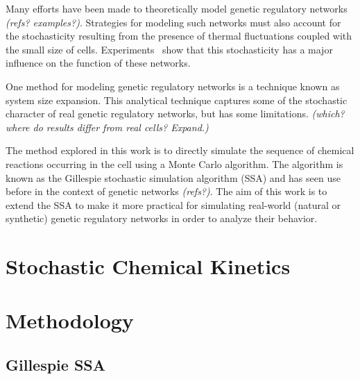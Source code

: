 \documentclass[english,letterpaper,12pt]{article}
\begin{document}
\begin{doublespacing}
Many efforts have been made to theoretically model genetic regulatory networks \textit{(refs? examples?)}. Strategies for modeling such networks must also account for the stochasticity resulting from the presence of thermal fluctuations coupled with the small size of cells. Experiments~\cite{ecoli-decision} show that this stochasticity has a major influence on the function of these networks.

One method for modeling genetic regulatory networks is a technique known as system size expansion. This analytical technique captures some of the stochastic character of real genetic regulatory networks, but has some limitations. \textit{(which? where do results differ from real cells? Expand.)}

The method explored in this work is to directly simulate the sequence of chemical reactions occurring in the cell using a Monte Carlo algorithm. The algorithm is known as the Gillespie stochastic simulation algorithm (SSA) and has seen use before in the context of genetic networks \textit{(refs?)}. The aim of this work is to extend the SSA to make it more practical for simulating real-world (natural or synthetic) genetic regulatory networks in order to analyze their behavior.


\section{Stochastic Chemical Kinetics} %
\label{sec:chemkin}






\section{Methodology} %
\label{sec:methodology}

\subsection{Gillespie SSA} %
\label{sub:gillespie-ssa}



\end{doublespacing}
\end{document}
